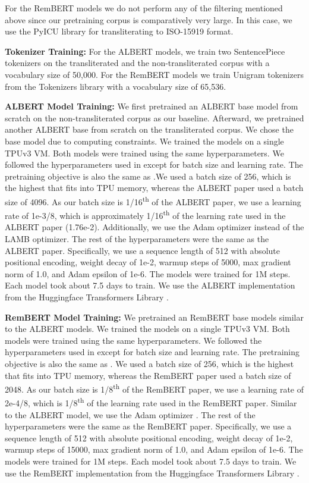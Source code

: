 \documentclass[11pt]{article}
\begin{document}
For the RemBERT models we do not perform any of the filtering mentioned above since our pretraining corpus is comparatively very large. In this case, we use the PyICU library \citep{pyicu} for transliterating to ISO-15919 format.

\textbf{Tokenizer Training:} For the ALBERT models, we train two SentencePiece tokenizers \citep{Kudo2018SentencePieceAS} on the transliterated and the non-transliterated corpus with a vocabulary size of 50,000. For the RemBERT models we train Unigram tokenizers from the Tokenizers library \citep{wolf-etal-2020-transformers} with a vocabulary size of 65,536.


\textbf{ALBERT Model Training:} We first pretrained an ALBERT base model from scratch on the non-transliterated corpus as our baseline. Afterward, we pretrained another ALBERT base from scratch on the transliterated corpus. We chose the base model due to computing constraints. We trained the models on a single TPUv3 VM. Both models were trained using the same hyperparameters. We followed the hyperparameters used in \citep{Lan2020ALBERTAL} except for batch size and learning rate. The pretraining objective is also the same as \citep{Lan2020ALBERTAL}.We used a batch size of 256, which is the highest that fits into TPU memory, whereas the ALBERT paper used a batch size of 4096. As our batch size is 1/16\textsuperscript{th} of the ALBERT paper, we use a learning rate of 1e-3/8, which is approximately 1/16\textsuperscript{th} of the learning rate used in the ALBERT paper (1.76e-2). Additionally, we use the Adam optimizer \citep{Kingma2015AdamAM} instead of the LAMB optimizer. The rest of the hyperparameters were the same as the ALBERT paper. Specifically, we use a sequence length of 512 with absolute positional encoding, weight decay of 1e-2, warmup steps of 5000, max gradient norm of 1.0, and Adam epsilon of 1e-6. The models were trained for 1M steps. Each model took about 7.5 days to train. We use the ALBERT implementation from the Huggingface Transformers Library \citep{wolf-etal-2020-transformers}. 

\textbf{RemBERT Model Training:} We pretrained an RemBERT base models similar to the ALBERT models. We trained the models on a single TPUv3 VM. Both models were trained using the same hyperparameters. We followed the hyperparameters used in \citep{Chung2021RethinkingEC} except for batch size and learning rate. The pretraining objective is also the same as \citep{Chung2021RethinkingEC}. We used a batch size of 256, which is the highest that fits into TPU memory, whereas the RemBERT paper used a batch size of 2048. As our batch size is 1/8\textsuperscript{th} of the RemBERT paper, we use a learning rate of 2e-4/8, which is  1/8\textsuperscript{th} of the learning rate used in the RemBERT paper. Similar to the ALBERT model, we use the Adam optimizer \citep{Kingma2015AdamAM}. The rest of the hyperparameters were the same as the RemBERT paper. Specifically, we use a sequence length of 512 with absolute positional encoding, weight decay of 1e-2, warmup steps of 15000, max gradient norm of 1.0, and Adam epsilon of 1e-6. The models were trained for 1M steps. Each model took about 7.5 days to train. We use the RemBERT implementation from the Huggingface Transformers Library \citep{wolf-etal-2020-transformers}.
\end{document}
